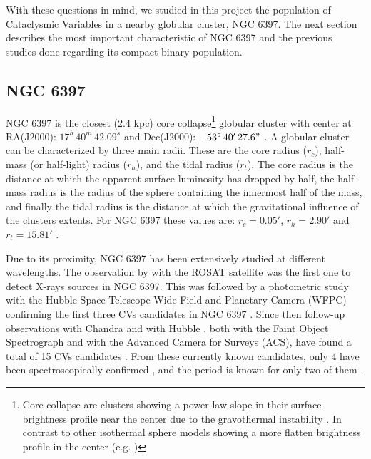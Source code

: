 With these questions in mind, we studied in this project the population of Cataclysmic Variables in a nearby globular cluster, NGC 6397. The next section describes the most important characteristic of NGC 6397 and the previous studies done regarding its compact binary population. 



\subsection{NGC 6397}
NGC 6397 is the closest (2.4 kpc) core collapse\footnote{Core collapse are clusters showing a power-law slope in their surface brightness profile near the center due to the gravothermal instability \citep{antonov_solution_1962,lynden-bell_gravo-thermal_1968,lynden-bell_consequences_1980}. In contrast to other isothermal sphere models showing a more flatten brightness profile in the center (e.g. \citealp{king_structure_1966})} globular cluster \citep{harris_catalog_1996,mclaughlin_resolved_2005} with center at RA(J2000): $17^h \, 40^m \, 42.09^s$  and Dec(J2000): $-53^\circ \, 40'\, 27.6"$ \citep{harris_catalog_1996}. A globular cluster can be characterized by three main radii. These are the core radius ($r_c$), half-mass (or half-light) radius ($r_h$), and the tidal radius ($r_t$). The core radius is the distance at which the apparent surface luminosity has dropped by half, the half-mass radius is the radius of the sphere containing the innermost half of the mass, and finally the tidal radius is the distance at which the gravitational influence of the clusters extents. For NGC 6397 these values are: $r_c=0.05'$, $r_h=2.90'$ and $r_t = 15.81'$ \citep{harris_catalog_1996}. 

Due to its proximity, NGC 6397 has been extensively studied at different  wavelengths. The observation by \cite{cool_discovery_1993} with the ROSAT satellite was the first one to detect X-rays sources in NGC 6397. This was followed by a photometric study with the Hubble Space Telescope Wide Field and Planetary Camera (WFPC) confirming the first three CVs candidates in NGC 6397 \citep{cool_discovery_1995}. Since then follow-up observations with Chandra \citep{grindlay_chandra_2001,bogdanov_chandra_2010} and with Hubble \citep{taylor_helium_2001,grindlay_compact_2006}, both with the Faint Object Spectrograph and with the Advanced Camera for Surveys (ACS), have found a total of 15 CVs candidates \citep{cohn_identification_2010}. From these currently known candidates, only 4 have been spectroscopically confirmed \citep{grindlay_spectroscopic_1995,edmonds_cataclysmic_1999}, and the period is known for only two of them \citep{kaluzny_time_2003,kaluzny_photometric_2006}. 

